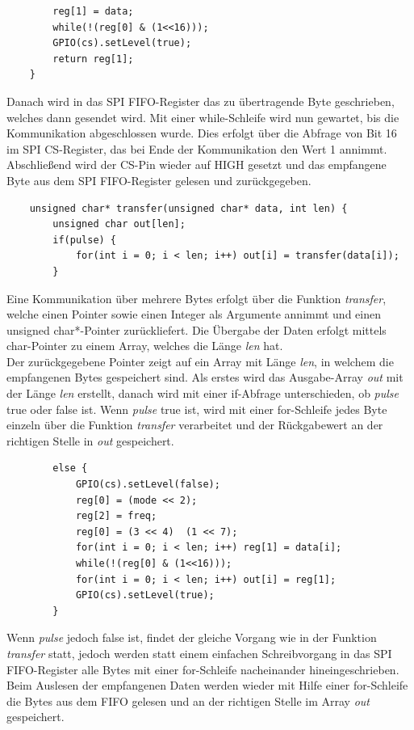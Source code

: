 \documentclass[12pt]{article}
\begin{document}
\begin{verbatim}
        reg[1] = data;
        while(!(reg[0] & (1<<16)));
        GPIO(cs).setLevel(true);
        return reg[1];
    }
\end{verbatim}
\vspace{-2mm}
Danach wird in das SPI FIFO-Register das zu übertragende Byte geschrieben, welches dann gesendet wird. Mit einer while-Schleife wird nun gewartet, bis die Kommunikation abgeschlossen wurde. Dies erfolgt über die Abfrage von Bit 16 im SPI CS-Register, das bei Ende der Kommunikation den Wert 1 annimmt. Abschließend wird der CS-Pin wieder auf HIGH gesetzt und das empfangene Byte aus dem SPI FIFO-Register gelesen und zurückgegeben.\\
\begin{verbatim}
    unsigned char* transfer(unsigned char* data, int len) {
        unsigned char out[len];
        if(pulse) {
            for(int i = 0; i < len; i++) out[i] = transfer(data[i]);
        } 
\end{verbatim}
\vspace{-2mm}
Eine Kommunikation über mehrere Bytes erfolgt über die Funktion \textit{transfer}, welche einen Pointer sowie einen Integer als Argumente annimmt und einen unsigned char*-Pointer zurückliefert. Die Übergabe der Daten erfolgt mittels char-Pointer zu einem Array, welches die Länge \textit{len} hat.\\
Der zurückgegebene Pointer zeigt auf ein Array mit Länge \textit{len}, in welchem die empfangenen Bytes gespeichert sind. Als erstes wird das Ausgabe-Array \textit{out} mit der Länge \textit{len} erstellt, danach wird mit einer if-Abfrage unterschieden, ob \textit{pulse} true oder false ist. Wenn \textit{pulse} true ist, wird mit einer for-Schleife jedes Byte einzeln über die Funktion \textit{transfer} verarbeitet und der Rückgabewert an der richtigen Stelle in \textit{out} gespeichert.\\
\begin{verbatim}
        else {
            GPIO(cs).setLevel(false);
            reg[0] = (mode << 2);
            reg[2] = freq;
            reg[0] = (3 << 4)  (1 << 7);
            for(int i = 0; i < len; i++) reg[1] = data[i];
            while(!(reg[0] & (1<<16)));
            for(int i = 0; i < len; i++) out[i] = reg[1];
            GPIO(cs).setLevel(true);
        } 
\end{verbatim}
\vspace{-2mm}
Wenn \textit{pulse} jedoch false ist, findet der gleiche Vorgang wie in der Funktion \textit{transfer} statt, jedoch werden statt einem einfachen Schreibvorgang in das SPI FIFO-Register alle Bytes mit einer for-Schleife nacheinander hineingeschrieben. Beim Auslesen der empfangenen Daten werden wieder mit Hilfe einer for-Schleife die Bytes aus dem FIFO gelesen und an der richtigen Stelle im Array \textit{out} gespeichert.\\
\end{document}
